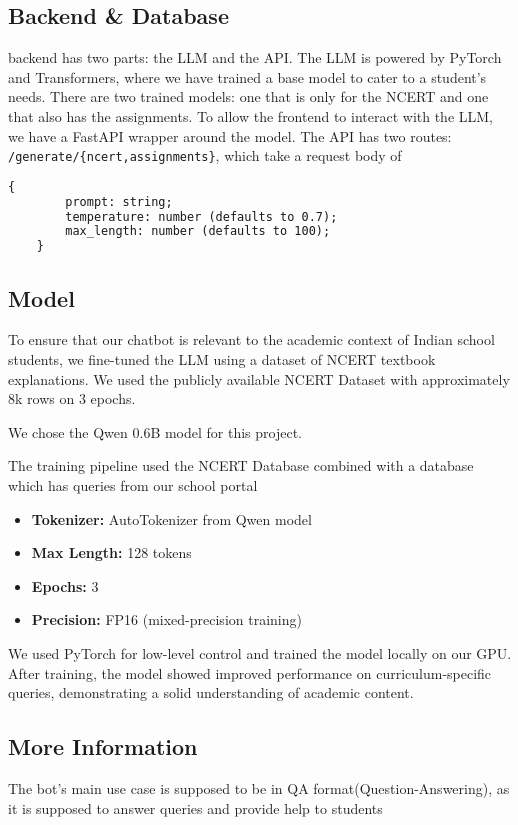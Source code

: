 \documentclass[9pt,a4paper,twocolumn,twoside]{tau-class/tau}
\begin{document}
\subsection{Backend \& Database}
backend has two parts: the LLM and the API. The LLM is powered by PyTorch and Transformers, where we have trained a base model to cater to a student's needs. There are two trained models: one that is only for the NCERT and one that also has the assignments. To allow the frontend to interact with the LLM, we have a FastAPI wrapper around the model. The API has two routes: \verb|/generate/{ncert,assignments}|, which take a request body of \begin{lstlisting}[language=TeX, caption=Request Body for /generate/*]
	{
		prompt: string;
		temperature: number (defaults to 0.7);
		max_length: number (defaults to 100);
	}
\end{lstlisting}
\subsection{Model}
To ensure that our chatbot is relevant to the academic context of Indian school students, we fine-tuned the LLM using a dataset of NCERT textbook explanations. We used the publicly available NCERT Dataset with approximately 8k rows on 3 epochs.

We chose the Qwen 0.6B model for this project.

The training pipeline used the NCERT Database combined with a database which has queries from our school portal
\begin{itemize}
	\item \textbf{Tokenizer:} AutoTokenizer from Qwen model
	\item \textbf{Max Length:} 128 tokens
	\item \textbf{Epochs:} 3
	\item \textbf{Precision:} FP16 (mixed-precision training)
\end{itemize}

We used PyTorch for low-level control and trained the model locally on our GPU. After training, the model showed improved performance on curriculum-specific queries, demonstrating a solid understanding of academic content.

\subsection{More Information}

The bot's main use case is supposed to be in QA format(Question-Answering), as it is supposed to answer queries and provide help to students
\end{document}
